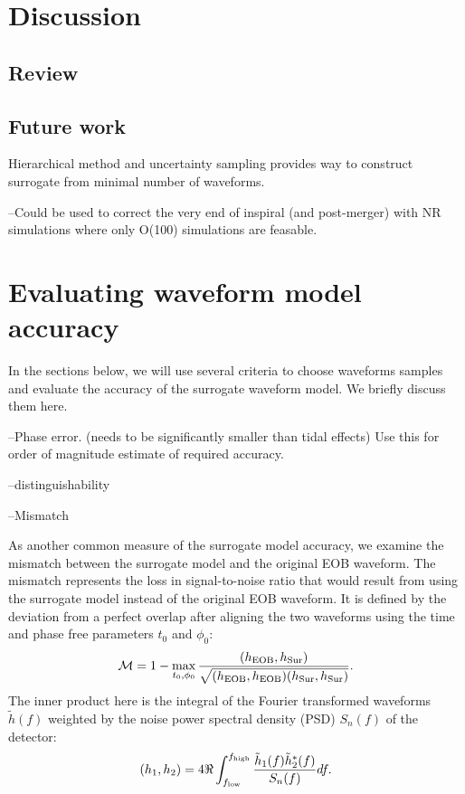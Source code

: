 \documentclass[prd,aps,letter,twocolumn,floatfix,notitlepage,nofootinbib]{revtex4-1}
\begin{document}
\section{Discussion}

\subsection{Review}



\subsection{Future work}

Hierarchical method and uncertainty sampling provides way to construct surrogate from minimal number of waveforms.

--Could be used to correct the very end of inspiral (and post-merger) with NR simulations where only O(100) simulations are feasable.




\section{Evaluating waveform model accuracy}

In the sections below, we will use several criteria to choose waveforms samples and evaluate the accuracy of the 
surrogate waveform model. We briefly discuss them here.

--Phase error. (needs to be significantly smaller than tidal effects) Use this for order of magnitude estimate of required
accuracy.

--distinguishability

--Mismatch

As another common measure of the surrogate model accuracy, we examine the mismatch between 
the surrogate model and the original EOB waveform.
The mismatch represents the loss in signal-to-noise ratio that would result 
from using the surrogate model instead of the original EOB waveform. 
It is defined by the deviation from a perfect overlap after aligning the two waveforms
using the time and phase free parameters $t_0$ and $\phi_0$:
\begin{equation}
\mathcal{M} = 1 - \max_{t_0, \phi_0} \frac{(h_{\rm EOB}, h_{\rm Sur})} {\sqrt{(h_{\rm EOB}, h_{\rm EOB}) (h_{\rm Sur}, h_{\rm Sur})}}.
\end{equation}
The inner product here  is the integral of the Fourier transformed waveforms $\tilde h(f)$ weighted by the noise power spectral 
density (PSD) $S_n(f)$ of the detector:
\begin{equation}
(h_1, h_2) = 4 \Re \int_{f_{\rm low}}^{f_{\rm high}} \frac{\tilde h_1(f) \tilde h^*_2(f)} {S_n(f)} df.
\end{equation}
\end{document}
